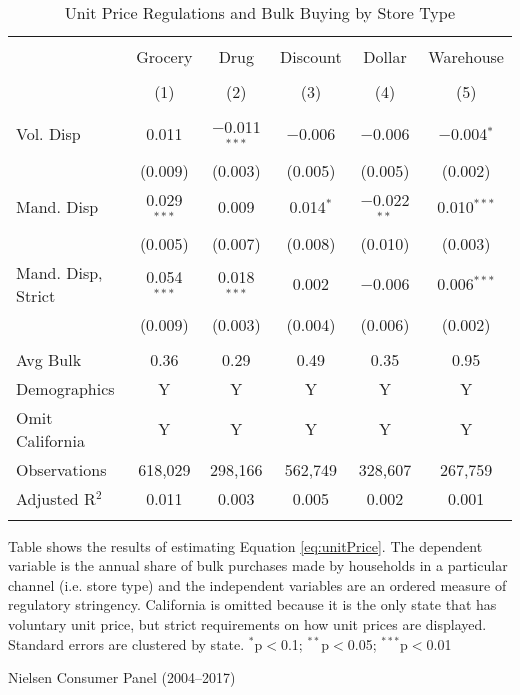 \begin{table}[!htbp] \centering
  \caption{Unit Price Regulations and Bulk Buying by Store Type}
  \label{tab:unitPriceLawChannel}
\begin{tabular}{lccccc}
\\[-1.8ex]\hline
\hline \\[-1.8ex]
 & Grocery & Drug & Discount & Dollar & Warehouse \\
\\[-1.8ex] & (1) & (2) & (3) & (4) & (5)\\
\hline \\[-1.8ex]
 Vol. Disp & 0.011 & $-$0.011$^{***}$ & $-$0.006 & $-$0.006 & $-$0.004$^{*}$ \\
  & (0.009) & (0.003) & (0.005) & (0.005) & (0.002) \\
  Mand. Disp & 0.029$^{***}$ & 0.009 & 0.014$^{*}$ & $-$0.022$^{**}$ & 0.010$^{***}$ \\
  & (0.005) & (0.007) & (0.008) & (0.010) & (0.003) \\
  Mand. Disp, Strict & 0.054$^{***}$ & 0.018$^{***}$ & 0.002 & $-$0.006 & 0.006$^{***}$ \\
  & (0.009) & (0.003) & (0.004) & (0.006) & (0.002) \\
 \hline \\[-1.8ex]
Avg Bulk & 0.36 & 0.29 & 0.49 & 0.35 & 0.95 \\
Demographics & Y & Y & Y & Y & Y \\
Omit California & Y & Y & Y & Y & Y \\
Observations & 618,029 & 298,166 & 562,749 & 328,607 & 267,759 \\
Adjusted R$^{2}$ & 0.011 & 0.003 & 0.005 & 0.002 & 0.001 \\
\hline
\hline \\[-1.8ex]
\end{tabular}
\begin{tablenotes}
Table shows the results of estimating Equation \ref{eq:unitPrice}. The dependent variable is the annual share of bulk purchases made by households in a particular channel (i.e. store type) and the independent variables are an ordered measure of regulatory stringency. California is omitted because it is the only state that has voluntary unit price, but strict requirements on how unit prices are displayed. Standard errors are clustered by state. $^{*}$p$<$0.1; $^{**}$p$<$0.05; $^{***}$p$<$0.01
\end{tablenotes}
\begin{tablenotes}[Source]
Nielsen Consumer Panel (2004--2017)
\end{tablenotes}
\end{table}
